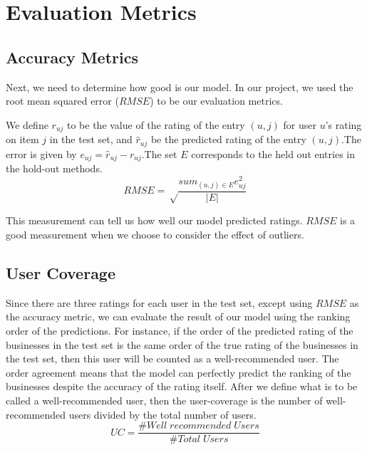 \documentclass[journal]{IEEEtran}
\begin{document}






\section{Evaluation Metrics}

\subsection{Accuracy Metrics}

Next, we need to determine how good is our model. In our project, we used the root mean squared error ($RMSE$) to be our evaluation metrics.

We define $r_{uj}$ to be the value of the rating of the entry $(u, j)$ for user $u$'s rating on item $j$ in the test set, and $\hat r_{uj}$ be the predicted rating of the entry $(u,j)$.The error is given by $e_{uj} = \hat r_{uj} - r_{uj}$.The set $E$ corresponds to the held out entries in the hold-out methods.
$$RMSE = \sqrt \frac{{sum_{(u,j) \in E}e_{uj}^2}}{|E|}$$

This measurement can tell us how well our model predicted ratings. $RMSE$ is a good measurement when we choose to consider the effect of outliers.

\subsection{User Coverage}
Since there are three ratings for each user in the test set, except using $RMSE$ as the accuracy metric, we can evaluate the result of our model using the ranking order of the predictions. For instance, if the order of the predicted rating of the businesses in the test set is the same order of the true rating of the businesses in the test set, then this user will be counted as a well-recommended user. The order agreement means that the model can perfectly predict the ranking of the businesses despite the accuracy of the rating itself. After we define what is to be called a well-recommended user, then the user-coverage is the number of well-recommended users divided by the total number of users.
$$ UC = \frac{\# Well \; recommended \; Users}{\# Total \; Users}$$
\end{document}
